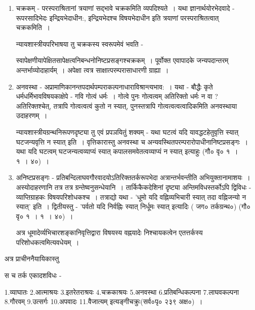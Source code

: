 {\begin{enumerate}
न्यायशास्त्रीयपरिभाषया तु अन्योन्याश्रयस्य स्वरूपमेवं भवति - 

स्वापेक्षापेक्षितत्वनिबन्धनोऽनिष्टप्रसङ्गोऽन्योन्याश्रयः~। अस्योदाहरणम् - 'यथा अयं घटो यद्येतद्धटज्ञानजन्यज्ञानविषयः स्यात् एतद्धटभिन्नः स्यात् इति~। अत्रापि उत्पत्तौ स्थितौ च उपर्युक्तरीत्या द्वैविध्यं स्वयमुदाहार्यम्~। 
\item	चक्रकम् - परस्पराश्रितानां त्रयाणां सद्भावे चक्रकमिति व्यपदिश्यते~। यथा  ज्ञानार्थयोरभेदवादे - रूपरसादिभेदः इन्द्रियभेदाधीन:, इन्द्रियभेदश्च विषयभेदाधीन इति त्रयाणां परस्पराश्रितत्वात् चक्रकमिति~। 

न्यायशास्त्रीयपरिभाषया तु चक्रकस्य स्वरूपमेवं भवति -  

स्वापेक्षणीयापेक्षितसापेक्षत्वनिबन्धनोनिष्टप्रसङ्गश्चक्रकम्~। पूर्वोक्त एवापादके जन्यपदान्तरम् अन्तर्भाव्योदाहार्यम्~। अपेक्षा त्वत्र साक्षात्परम्परासाधारणी ग्राह्या~। 
\item	अनवस्था - अप्रामाणिकानन्तपदार्थपम्पराकल्पनाधाराविश्रान्त्यभाव:~। यथा - बौद्धैः  कृते धर्मधर्मिभावविषयकाक्षेपे - गवि गोत्वं धर्मः~। गोत्वे पुनः गोत्वत्वम् अतिरिक्तो धर्मः न वा ? अतिरिक्तश्चेत्, तत्रापि गोत्वत्वत्वं कुतो न स्यात्, पुनस्तत्रापि गोत्वत्वत्वत्वादिकमिति अनवस्थाया उदाहरणम्~। 

न्यायशास्त्रीयग्रन्थनिरूपणदृष्ट्या तु एवं प्रपञयितुं शक्यम् - यथा घटत्वं यदि यावद्धटहेतुवृत्ति स्यात् घटजन्यवृत्ति न स्यात् इति~। वृत्तिकारास्तु अनवस्था च अन्यवस्थितपरम्परारोपाधीनानिष्टप्रसङ्गः~। यथा यदि घटत्वम् घटजन्यत्वव्याप्यं स्यात् कपालसमवेतत्वव्याप्यं न स्यात् इत्याहुः (गौ० वृ० १~। १~। ४०)~। 
\item	अनिष्टप्रसङ्गः - प्रतिबन्दिलाघवगौरवादयोऽतिरिक्ततर्करूपभेदा अत्रान्तर्भवन्तीति  अभियुक्तानामाशयः~। अस्योदाहरणानि तत्र तत्र ग्रन्तेष्वनुसन्धेयानि~। तार्किकैकदेशिनां दृष्ट्या अन्तिमविधस्तर्कोऽपि द्विविधः -  व्याप्तिग्राहकः विषयपरिशोधकश्च~। तत्राद्यो यथा - 'धूमो यदि वह्निव्यभिचारी स्यात् तदा वह्निजन्यो न स्यात्' इति~। द्वितीयस्तु - 'पर्वतो यदि निर्वह्निः स्यात् निर्धूमः स्यात् इत्यादिः ( जग० तर्कग्रन्थ०) (गौ० वृ० १~। १~। ४०)~। 

अत्र धूमादेर्व्यभिचारशङ्कानिवृत्तिद्वारा विषयस्य वह्नयादेः निश्चायकत्वेन एतत्तर्कस्य परिशोधकत्वमित्यवधेयम्~। 
\end{enumerate}

अत्र प्राचीननैयायिकास्तु 

स च तर्क एकादशविधः - 

1.व्याघातः 2.आत्माश्रयः 3.इतरेतराश्रयः 4.चक्रकाश्रयः 5.अनवस्था 6.प्रतिबन्धिकल्पना  7.लाघवकल्पना 8.गौरवम् 9.उत्सर्गः 10.अपवादः 11.वैजात्यम् इत्यङ्गीचक्रुः(सर्व०पृ० २३९ अक्ष०)~। 

}
